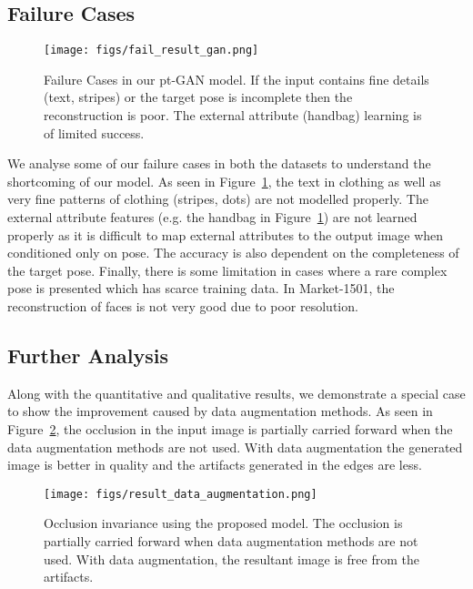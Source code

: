 \documentclass[runningheads]{llncs}
\begin{document}
\subsection{Failure Cases}
\vspace{-4mm}
\begin{figure}[H]
	\centering
	\texttt{[image: figs/fail\_result\_gan.png]}
	\caption{Failure Cases in our pt-GAN model. If the input contains fine details (text, stripes) or the target pose is incomplete then the reconstruction is poor. The external attribute (handbag) learning is of limited success.}
	\label{fig:fail_result}
\end{figure}
\vspace{-3mm}
%
We analyse some of our failure cases in both the datasets to understand the shortcoming of our model. As seen in Figure~\ref{fig:fail_result}, the text in clothing as well as very fine patterns of clothing (stripes, dots) are not modelled properly. The external attribute features (e.g. the handbag in Figure~\ref{fig:fail_result}) are not learned properly as it is difficult to map external attributes to the output image when conditioned only on pose. The accuracy is also dependent on the completeness of the target pose. Finally, there is some limitation in cases where a rare complex pose is presented which has scarce training data. In Market-1501, the reconstruction of faces is not very good due to poor resolution.
%
\subsection{Further Analysis}
%
Along with the quantitative and qualitative results, we demonstrate a special case to show the improvement caused by data augmentation methods. As seen in Figure~\ref{fig:occlusion_inv}, the occlusion in the input image is partially carried forward when the data augmentation methods are not used. With data augmentation the generated image is better in quality and the artifacts generated in the edges are less. 
%
\begin{figure}[!ht]
	\centering
	\texttt{[image: figs/result\_data\_augmentation.png]}
	\caption{Occlusion invariance using the proposed model. The occlusion is partially carried forward when data augmentation methods are not used. With data augmentation, the resultant image is free from the artifacts.}
	\label{fig:occlusion_inv}
\end{figure}
\vspace{-6mm}
%
\end{document}

